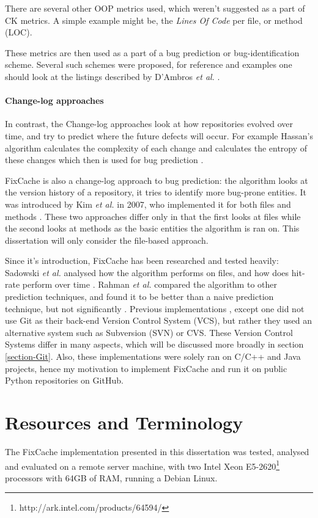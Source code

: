 \documentclass[12pt,twoside,notitlepage]{report}
\newcommand{\fxch}{FixCache}
\newcommand{\etal}{\textit{et al.}}
\begin{document}
There are several other OOP metrics used, which weren't suggested as a part of CK metrics. A simple example might be, the \textit{Lines Of Code} per file, or method (LOC).

These metrics are then used as a part of a bug prediction or bug-identification scheme. Several such schemes were proposed, for reference and examples one should look at the listings described by D'Ambros \textit{et al.} \cite{5463279}.

\paragraph{Change-log approaches}In contrast, the Change-log approaches look at how repositories evolved over time, and try to predict where the future defects will occur. For example Hassan's algorithm calculates the complexity of each change and calculates the entropy of these changes which then is used for bug prediction \cite{hassan}.

\fxch{} is also a change-log approach to bug prediction: the algorithm looks at the version history of a repository, it tries to identify more bug-prone entities. It was introduced by Kim \textit{et al.} in 2007, who implemented it for both files and methods \cite{FixCache}. These two approaches differ only in that the first looks at files while the second looks at methods as the basic entities the algorithm is ran on. This dissertation will only consider the file-based approach.

Since it's introduction, \fxch{} has been researched and tested heavily: Sadowski \etal{} analysed how the algorithm performs on files, and how does hit-rate perform over time \cite{Sadowski}. Rahman \etal{} compared the algorithm to other prediction techniques, and found it to be better than a naive prediction technique, but not significantly \cite{Bugcache}.
\clearpage
Previous implementations \cite{FixCache}\cite{Sadowski}, except one \cite{Bugcache} did not use Git \cite{TorvaldsGit} as their back-end Version Control System (VCS), but rather they used an alternative system such as Subversion (SVN) or CVS. These Version Control Systems differ in many aspects, which will be discussed more broadly in section \ref{section-Git}. Also, these implementations were solely ran on C/C++ and Java projects, hence my motivation to implement \fxch{} and run it on public Python repositories on GitHub.
\section{Resources and Terminology}
The \fxch{} implementation presented in this dissertation was tested, analysed and evaluated on a remote server machine, with two Intel Xeon E5-2620\footnote{http://ark.intel.com/products/64594/} processors with 64GB of RAM, running a Debian Linux.
\end{document}
